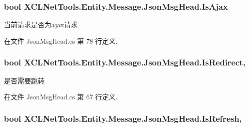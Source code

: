 \subsubsection[{\texorpdfstring{Is\+Ajax}{IsAjax}}]{\setlength{\rightskip}{0pt plus 5cm}bool X\+C\+L\+Net\+Tools.\+Entity.\+Message.\+Json\+Msg\+Head.\+Is\+Ajax\hspace{0.3cm}{\ttfamily [get]}}\hypertarget{class_x_c_l_net_tools_1_1_entity_1_1_message_1_1_json_msg_head_adedb9cb59037071c879572360cebc574}{}\label{class_x_c_l_net_tools_1_1_entity_1_1_message_1_1_json_msg_head_adedb9cb59037071c879572360cebc574}


当前请求是否为ajax请求 



在文件 Json\+Msg\+Head.\+cs 第 78 行定义.

\subsubsection[{\texorpdfstring{Is\+Redirect}{IsRedirect}}]{\setlength{\rightskip}{0pt plus 5cm}bool X\+C\+L\+Net\+Tools.\+Entity.\+Message.\+Json\+Msg\+Head.\+Is\+Redirect\hspace{0.3cm}{\ttfamily [get]}, {\ttfamily [set]}}\hypertarget{class_x_c_l_net_tools_1_1_entity_1_1_message_1_1_json_msg_head_afc78f2a88e510206f023edef4b774f21}{}\label{class_x_c_l_net_tools_1_1_entity_1_1_message_1_1_json_msg_head_afc78f2a88e510206f023edef4b774f21}


是否需要跳转 



在文件 Json\+Msg\+Head.\+cs 第 67 行定义.

\subsubsection[{\texorpdfstring{Is\+Refresh}{IsRefresh}}]{\setlength{\rightskip}{0pt plus 5cm}bool X\+C\+L\+Net\+Tools.\+Entity.\+Message.\+Json\+Msg\+Head.\+Is\+Refresh\hspace{0.3cm}{\ttfamily [get]}, {\ttfamily [set]}}\hypertarget{class_x_c_l_net_tools_1_1_entity_1_1_message_1_1_json_msg_head_a85badfa18d73101bd7038ad7a8bc70f0}{}\label{class_x_c_l_net_tools_1_1_entity_1_1_message_1_1_json_msg_head_a85badfa18d73101bd7038ad7a8bc70f0}


